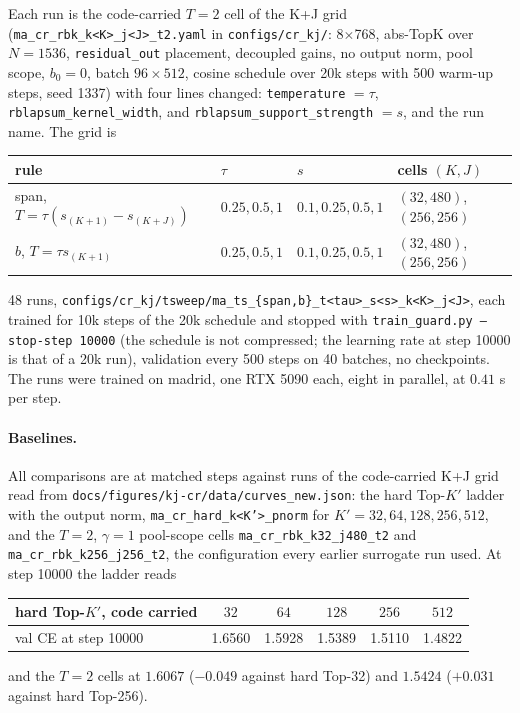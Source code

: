 \documentclass[11pt,a4paper]{article}
\newcommand{\code}[1]{\texttt{#1}}
\newcommand{\Kp}{K'}
\begin{document}
Each run is the code-carried $T = 2$ cell of the K+J grid
(\code{ma\_cr\_rbk\_k<K>\_j<J>\_t2.yaml} in \code{configs/cr\_kj/}: 8$\times$768, abs-TopK
over $N = 1536$, \code{residual\_out} placement, decoupled gains, no output
norm, pool scope, $b_0 = 0$, batch $96 \times 512$, cosine schedule over 20k
steps with 500 warm-up steps, seed 1337) with four lines changed:
\code{temperature} $= \tau$, \code{rblapsum\_kernel\_width}, and
\code{rblapsum\_support\_strength} $= s$, and the run name. The grid is
\begin{center}\small
\begin{tabular}{llll}
\toprule
rule & $\tau$ & $s$ & cells $(K, J)$ \\
\midrule
span, $T = \tau(s_{(K+1)} - s_{(K+J)})$ & $0.25, 0.5, 1$ & $0.1, 0.25, 0.5, 1$ & $(32, 480)$, $(256, 256)$ \\
$b$, $T = \tau s_{(K+1)}$ & $0.25, 0.5, 1$ & $0.1, 0.25, 0.5, 1$ & $(32, 480)$, $(256, 256)$ \\
\bottomrule
\end{tabular}
\end{center}
48 runs, \code{configs/cr\_kj/tsweep/ma\_ts\_\{span,b\}\_t<tau>\_s<s>\_k<K>\_j<J>},
each trained for 10k steps of the 20k schedule and stopped with
\code{train\_guard.py --stop-step 10000} (the schedule is not compressed; the
learning rate at step 10000 is that of a 20k run), validation every 500
steps on 40 batches, no checkpoints. The runs were trained on madrid, one
RTX 5090 each, eight in parallel, at $0.41$ s per step.

\paragraph{Baselines.}
All comparisons are at matched steps against runs of the code-carried K+J
grid read from \code{docs/figures/kj-cr/data/curves\_new.json}: the hard
Top-$\Kp$ ladder with the output norm, \code{ma\_cr\_hard\_k<K'>\_pnorm} for
$\Kp = 32, 64, 128, 256, 512$, and the $T = 2$, $\gamma = 1$ pool-scope cells
\code{ma\_cr\_rbk\_k32\_j480\_t2} and \code{ma\_cr\_rbk\_k256\_j256\_t2}, the
configuration every earlier surrogate run used. At step 10000 the ladder
reads
\begin{center}\small
\begin{tabular}{lccccc}
\toprule
hard Top-$\Kp$, code carried & $32$ & $64$ & $128$ & $256$ & $512$ \\
\midrule
val CE at step 10000 & 1.6560 & 1.5928 & 1.5389 & 1.5110 & 1.4822 \\
\bottomrule
\end{tabular}
\end{center}
and the $T = 2$ cells at $1.6067$ ($-0.049$ against hard Top-32) and $1.5424$
($+0.031$ against hard Top-256).
\end{document}
